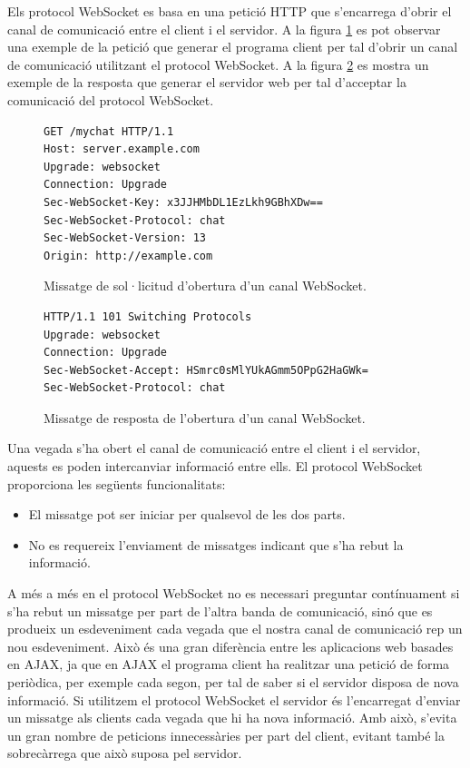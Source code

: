 Els protocol WebSocket es basa en una petició HTTP que s'encarrega d'obrir el canal de comunicació entre el client i el servidor. A la figura \ref{fig:websocket-request} es pot observar una exemple de la petició que generar el programa client per tal d'obrir un canal de comunicació utilitzant el protocol WebSocket. A la figura \ref{fig:websocket-response} es mostra un exemple de la resposta que generar el servidor web per tal d'acceptar la comunicació del protocol WebSocket. 

\begin{figure}[htbp]
\centering
\begin{verbatim}
GET /mychat HTTP/1.1
Host: server.example.com
Upgrade: websocket
Connection: Upgrade
Sec-WebSocket-Key: x3JJHMbDL1EzLkh9GBhXDw==
Sec-WebSocket-Protocol: chat
Sec-WebSocket-Version: 13
Origin: http://example.com
\end{verbatim}
\caption{Missatge de sol·licitud d'obertura d'un canal WebSocket.}
\label{fig:websocket-request}
\end{figure} 

\begin{figure}[htbp]
\centering
\begin{verbatim}
HTTP/1.1 101 Switching Protocols
Upgrade: websocket
Connection: Upgrade
Sec-WebSocket-Accept: HSmrc0sMlYUkAGmm5OPpG2HaGWk=
Sec-WebSocket-Protocol: chat
\end{verbatim}
\caption{Missatge de resposta de l'obertura d'un canal WebSocket.}
\label{fig:websocket-response}
\end{figure} 

Una vegada s'ha obert el canal de comunicació entre el client i el servidor, aquests es poden intercanviar informació entre ells. El protocol WebSocket proporciona les següents funcionalitats: 

\begin{itemize}
    \item{El missatge pot ser iniciar per qualsevol de les dos parts.}
    \item{No es requereix l'enviament de missatges indicant que s'ha rebut la informació.}
\end{itemize}

A més a més en el protocol WebSocket no es necessari preguntar contínuament si s'ha rebut un missatge per part de l'altra banda de comunicació, sinó que es produeix un esdeveniment cada vegada que el nostra canal de comunicació rep un nou esdeveniment. Això és una gran diferència entre les aplicacions web basades en AJAX, ja que en AJAX el programa client ha realitzar una petició de forma periòdica, per exemple cada segon, per tal de saber si el servidor disposa de nova informació. Si utilitzem el protocol WebSocket el servidor és l'encarregat d'enviar un missatge als clients cada vegada que hi ha nova informació. Amb això, s'evita un gran nombre de peticions innecessàries per part del client, evitant també la sobrecàrrega que això suposa pel servidor.

